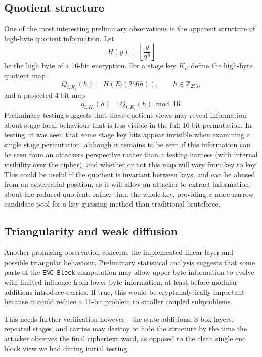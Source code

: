 \documentclass[11pt]{article}
\newcommand{\Z}[1]{\mathbb{Z}_{#1}}
\begin{document}
\subsection{Quotient structure}

One of the most interesting preliminary observations is the apparent structure of high-byte quotient information. Let
\[
H(y)=\left\lfloor \frac{y}{2^8}\right\rfloor
\]
be the high byte of a 16-bit encryption. For a stage key $K_i$, define the high-byte quotient map
\[
Q_{i,K_i}(h)=H(E_i(256h)),\qquad h\in\Z{256},
\]
and a projected 4-bit map
\[
q_{i,K_i}(h)=Q_{i,K_i}(h)\bmod 16.
\]
Preliminary testing suggests that these quotient views may reveal information about stage-local behaviour that is less visible in the full 16-bit permutation. In testing, it was seen that some stage key bits appear invisible when examining a single stage permutation, although it remains to be seen if this information can be seen from an attackers perspective rather than a testing harness (with internal visibility over the cipher), and whether or not this map will vary from key to key.\\

This could be useful if the quotient is invariant between keys, and can be abused from an adversarial position, as it will allow an attacker to extract information about the reduced quotient, rather than the whole key, providing a more narrow candidate pool for a key guessing method than traditional bruteforce.\\

\subsection{Triangularity and weak diffusion}

Another promising observation concerns the implemented linear layer and possible triangular behaviour. Preliminary statistical analysis suggests that some parts of the \texttt{ENC\_Block} computation may allow upper-byte information to evolve with limited influence from lower-byte information, at least before modular additions introduce carries. If true, this would be cryptanalytically important because it could reduce a 16-bit problem to smaller coupled subproblems.

This needs further verification however - the state additions, S-box layers, repeated stages, and carries may destroy or hide the structure by the time the attacker observes the final ciphertext word, as opposed to the clean single enc block view we had during initial testing.\\
\end{document}
